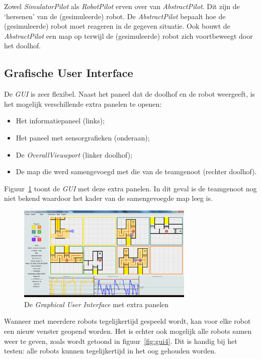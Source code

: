 \documentclass[eind]{penoverslag}
\begin{document}
Zowel \textit{SimulatorPilot} als \textit{RobotPilot} erven over van \textit{AbstractPilot}. Dit zijn de `hersenen' van de (gesimuleerde) robot. De \textit{AbstractPilot} bepaalt hoe de (gesimuleerde) robot moet reageren in de gegeven situatie. Ook bouwt de \textit{AbstractPilot} een map op terwijl de (gesimuleerde) robot zich voortbeweegt door het doolhof.

\subsection{Grafische User Interface}
\label{ssec:GUI}
De \textit{GUI} is zeer flexibel. Naast het paneel dat de doolhof en de robot weergeeft, is het mogelijk verschillende extra panelen te openen:

\begin{itemize}
	\item Het informatiepaneel (links);
	\item Het paneel met sensorgrafieken (onderaan);
	\item De \textit{OverallVieuwport} (linker doolhof);
	\item De map die werd samengevoegd met die van de teamgenoot (rechter doolhof).
\end{itemize}

Figuur~\ref{fig:guiAll} toont de \textit{GUI} met deze extra panelen. In dit geval is de teamgenoot nog niet bekend waardoor het kader van de samengevoegde map leeg is.\\

\begin{figure}[h]
\centering
	\includegraphics[width=0.75\textwidth]{guiALL}
\caption{De \textit{Graphical User Interface} met extra panelen}
\label{fig:guiAll}
\end{figure}

Wanneer met meerdere robots tegelijkertijd gespeeld wordt, kan voor elke robot een nieuw venster geopend worden. Het is echter ook mogelijk alle robots samen weer te geven, zoals wordt getoond in figuur~\ref{fig:gui4}. Dit is handig bij het testen: alle robots kunnen tegelijkertijd in het oog gehouden worden.
\end{document}
